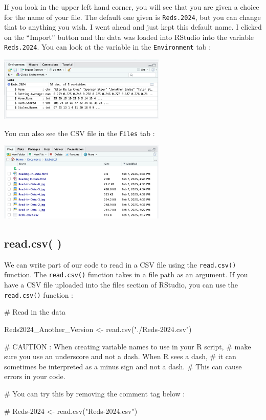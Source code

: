 \documentclass[
  letterpaper,
  DIV=11,
  numbers=noendperiod]{scrreprt}
\newenvironment{Shaded}{\begin{snugshade}}{\end{snugshade}}
\newcommand{\AlertTok}[1]{\textcolor[rgb]{0.68,0.00,0.00}{#1}}
\newcommand{\CommentTok}[1]{\textcolor[rgb]{0.37,0.37,0.37}{#1}}
\newcommand{\FunctionTok}[1]{\textcolor[rgb]{0.28,0.35,0.67}{#1}}
\newcommand{\NormalTok}[1]{\textcolor[rgb]{0.00,0.23,0.31}{#1}}
\newcommand{\OtherTok}[1]{\textcolor[rgb]{0.00,0.23,0.31}{#1}}
\newcommand{\StringTok}[1]{\textcolor[rgb]{0.13,0.47,0.30}{#1}}
\begin{document}
If you look in the upper left hand corner, you will see that you are
given a choice for the name of your file. The default one given is
\texttt{Reds.2024}, but you can change that to anything you wish. I went
ahead and just kept this default name. I clicked on the ``Import''
button and the data was loaded into RStudio into the variable
\texttt{Reds.2024}. You can look at the variable in the
\texttt{Environment} tab :

\includegraphics[width=0.6\textwidth,height=\textheight]{./images/Read-In-Data-7.jpg}

You can also see the CSV file in the \texttt{Files} tab :

\includegraphics[width=0.6\textwidth,height=\textheight]{./images/Read-In-Data-8.jpg}

\subsection*{read.csv( )}\label{read.csv}

We can write part of our code to read in a CSV file using the
\texttt{read.csv()} function. The \texttt{read.csv()} function takes in
a file path as an argument. If you have a CSV file uploaded into the
files section of RStudio, you can use the \texttt{read.csv()} function :

\begin{Shaded}
\begin{Highlighting}[]
\CommentTok{\# Read in the data}

\NormalTok{Reds2024\_Another\_Version }\OtherTok{\textless{}{-}} \FunctionTok{read.csv}\NormalTok{(}\StringTok{"./Reds{-}2024.csv"}\NormalTok{)}

\CommentTok{\# }\AlertTok{CAUTION}\CommentTok{ : When creating variable names to use in your R script,}
\CommentTok{\# make sure you use an underscore and not a dash. When R sees a dash, }
\CommentTok{\# it can sometimes be interpreted as a minus sign and not a dash. }
\CommentTok{\# This can cause errors in your code.}

\CommentTok{\# You can try this by removing the comment tag below :}

\CommentTok{\# Reds{-}2024 \textless{}{-} read.csv("Reds{-}2024.csv")}
\end{Highlighting}
\end{Shaded}
\end{document}
